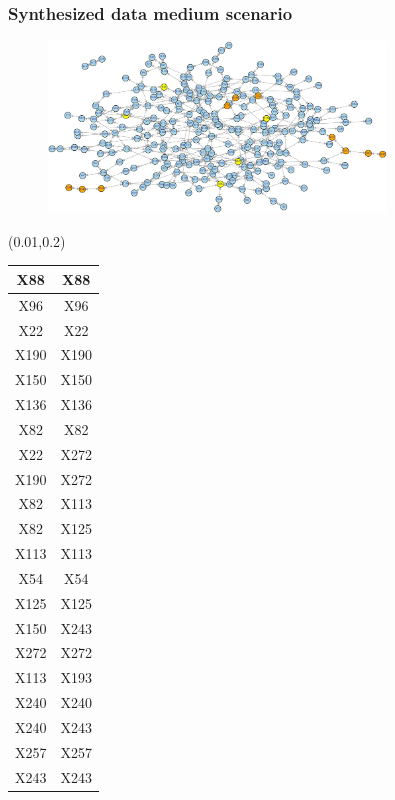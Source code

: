\documentclass{beamer}
\newcommand{\boz}{\cellcolor{pathwaynode}}
\newcommand{\ghool}{\cellcolor{independentnode}}
\begin{document}
\begin{frame}[plain]
  \frametitle{Synthesized data medium scenario}
  \begin{figure}
    \includegraphics[width=0.8\textwidth]{synthesized-medium}
  \end{figure}
  \begin{textblock*}{\paperwidth}(0.01\textwidth,0.2\textheight)
    \raggedright 
    \tiny
    \begin{tabular}{| c c |}
      \hline
\ghool X88   &  \ghool X88  \\ \hline
\ghool X96   &  \ghool X96  \\ \hline
\boz X22   &  \boz X22  \\ \hline
\boz X190   &  \boz X190  \\ \hline
\boz X150   &  \boz X150  \\ \hline
\ghool X136   &  \ghool X136  \\ \hline
\boz X82   &  \boz X82  \\ \hline
\boz X22   &  \boz X272  \\ \hline
\boz X190   &  \boz X272  \\ \hline
\boz X82   &  \boz X113  \\ \hline
\boz X82   &  \boz X125  \\ \hline
\boz X113   &  \boz X113  \\ \hline
\ghool X54   &  \ghool X54  \\ \hline
\boz X125   &  \boz X125  \\ \hline
\boz X150   &  \boz X243  \\ \hline
\boz X272   &  \boz X272  \\ \hline
\boz X113   &  \boz X193  \\ \hline
\boz X240   &  \boz X240  \\ \hline
\boz X240   &  \boz X243  \\ \hline
\ghool X257   &  \ghool X257  \\ \hline
\boz X243   &  \boz X243  \\ \hline

\end{tabular}
\end{textblock*}
\end{frame}
\end{document}
